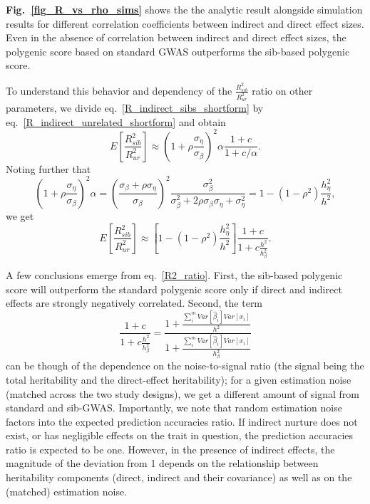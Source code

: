 \documentclass[hidelinks, 12pt]{article}
\begin{document}
{\bf Fig.~\ref{fig_R_vs_rho_sims}} shows the the analytic result alongside simulation results for different correlation coefficients between indirect and direct effect sizes.  Even in the absence of correlation between indirect and direct effect sizes, the polygenic score based on standard GWAS outperforms the sib-based polygenic score.  

To understand this behavior and dependency of the $\frac{R_{sib}^2}{R_{ur}^2}$ ratio on other parameters, we divide eq.~\ref{R_indirect_sibs_shortform} by eq.~\ref{R_indirect_unrelated_shortform} and obtain
$$E[\frac{R_{sib}^2}{R_{ur}^2}] \approx \left(1+\rho \frac{\sigma_{\eta}}{\sigma_{\beta}}\right)^{2}\alpha \frac{1+c}{1+c/\alpha}.$$
Noting further that
$$\left(1+\rho \frac{\sigma_{\eta}}{\sigma_{\beta}}\right)^{2} \alpha=\left(\frac{\sigma_\beta+\rho \sigma_\eta}{\sigma_\beta}\right)^{2} \frac{\sigma_\beta^{2}}{\sigma_\beta^{2}+2 \rho \sigma_{\beta} \sigma_{\eta}+\sigma_{\eta}^{2}}=1-(1-\rho^2)\frac{h_\eta^2}{h^2},$$
we get
\begin{equation}
\label{R2_ratio}
E[\frac{R_{sib}^2}{R_{ur}^2}] \approx [ 1-(1-\rho^2) \frac{h_\eta^2}{h^2}]\frac{1+c}{1+c\frac{h^2}{h_\beta^2}}.
\end{equation}

A few conclusions emerge from eq.~\ref{R2_ratio}.  First, the sib-based polygenic score will outperform the standard polygenic score only if direct and indirect effects are strongly negatively correlated.   Second, the term
$$\frac{1+c}{1+c\frac{h^2}{h_\beta^2}}=\frac{1+\frac{\sum_i^mVar[\hat{\beta}_i]Var[x_i]}{h^2}}{1+\frac{\sum_i^mVar[\hat{\beta}_i]Var[x_i]}{h_{\beta}^2}}$$
can be though of the dependence on the noise-to-signal ratio (the signal being the total heritability and the direct-effect heritability); for a given estimation noise (matched across the two study designs), we get a different amount of signal from standard and sib-GWAS.  Importantly, we note that random estimation noise factors into the expected prediction accuracies ratio.  If indirect nurture does not exist, or has negligible effects on the trait in question, the prediction accuracies ratio is expected to be one.  However, in the presence of indirect effects, the magnitude of the deviation from 1 depends on the relationship between heritability components (direct, indirect and their covariance) as well as on the (matched) estimation noise.


\end{document}
